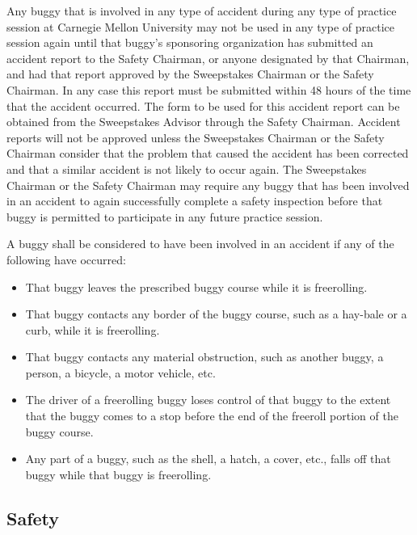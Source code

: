 	Any buggy that is involved in any type of accident during any type of practice
	session at Carnegie Mellon University may not be used in any type of practice
	session again until that buggy's sponsoring organization has submitted an
	accident report to the Safety Chairman, or anyone designated by that Chairman,
	and had that report approved by the Sweepstakes Chairman or the Safety
	Chairman. In any case this report must be submitted within 48 hours of the time
	that the accident occurred. The form to be used for this accident report can be
	obtained from the Sweepstakes Advisor through the Safety Chairman. Accident
	reports will not be approved unless the Sweepstakes Chairman or the Safety
	Chairman consider that the problem that caused the accident has been corrected
	and that a similar accident is not likely to occur again. The Sweepstakes
	Chairman or the Safety Chairman may require any buggy that has been involved in
	an accident to again successfully complete a safety inspection before that
	buggy is permitted to participate in any future practice session.
	\newline

	\noindent A buggy shall be considered to have been involved in an accident if any of the
	following have occurred:

	\begin{itemize}

		\item That buggy leaves the prescribed buggy course while it is
		freerolling.

		\item That buggy contacts any border of the buggy course, such as a
		hay-bale or a curb, while it is freerolling.

		\item That buggy contacts any material obstruction, such as another buggy,
		a person, a bicycle, a motor vehicle, etc.

		\item The driver of a freerolling buggy loses control of that buggy to the
		extent that the buggy comes to a stop before the end of the freeroll portion of
		the buggy course.

		\item Any part of a buggy, such as the shell, a hatch, a cover, etc., falls
		off that buggy while that buggy is freerolling.

	\end{itemize}

\subsection{Safety}

